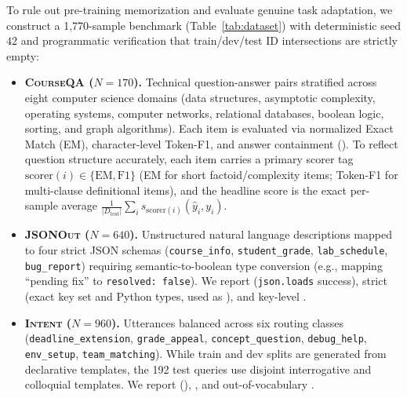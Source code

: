 \documentclass[10pt,a4paper,twocolumn]{article}
\begin{document}
To rule out pre-training memorization and evaluate genuine task adaptation, we construct a 1,770-sample benchmark (Table~\ref{tab:dataset}) with deterministic seed $42$ and programmatic verification that train/dev/test ID intersections are strictly empty:
\begin{itemize}\setlength{\itemsep}{1pt}\setlength{\parskip}{0pt}\setlength{\topsep}{2pt}
  \item \textbf{\textsc{CourseQA} ($N=170$).} Technical question-answer pairs stratified across eight computer science domains (data structures, asymptotic complexity, operating systems, computer networks, relational databases, boolean logic, sorting, and graph algorithms). Each item is evaluated via normalized Exact Match (EM), character-level Token-F1, and answer containment (). To reflect question structure accurately, each item carries a primary scorer tag $\text{scorer}(i) \in \{\text{EM}, \text{F1}\}$ (EM for short factoid/complexity items; Token-F1 for multi-clause definitional items), and the headline  score is the exact per-sample average $\frac{1}{|D_{\text{test}}|}\sum_{i} s_{\text{scorer}(i)}(\hat{y}_i, y_i)$.
  \item \textbf{\textsc{JSONOut} ($N=640$).} Unstructured natural language descriptions mapped to four strict JSON schemas (\texttt{course\_info}, \texttt{student\_grade}, \texttt{lab\_schedule}, \texttt{bug\_report}) requiring semantic-to-boolean type conversion (e.g., mapping ``pending fix'' to \texttt{resolved: false}). We report  (\texttt{json.loads} success), strict  (exact key set and Python types, used as ), and key-level .
  \item \textbf{\textsc{Intent} ($N=960$).} Utterances balanced across six routing classes (\texttt{deadline\_extension}, \texttt{grade\_appeal}, \texttt{concept\_question}, \texttt{debug\_help}, \texttt{env\_setup}, \texttt{team\_matching}). While train and dev splits are generated from declarative templates, the 192 test queries use disjoint interrogative and colloquial templates. We report  (), , and out-of-vocabulary .
\end{itemize}
\end{document}
